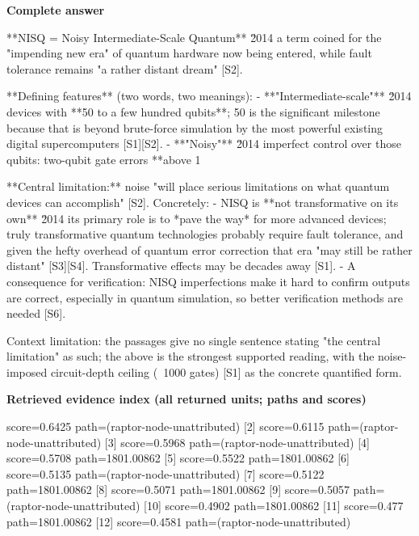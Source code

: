 \documentclass[10pt]{article}
\begin{document}
\textbf{Complete answer}
\begin{AnswerText}
**NISQ = Noisy Intermediate-Scale Quantum** \u2014 a term coined for the "impending new era" of quantum hardware now being entered, while fault tolerance remains "a rather distant dream" [S2].

**Defining features** (two words, two meanings):
- **"Intermediate-scale"** \u2014 devices with **50 to a few hundred qubits**; 50 is the significant milestone because that is beyond brute-force simulation by the most powerful existing digital supercomputers [S1][S2].
- **"Noisy"** \u2014 imperfect control over those qubits: two-qubit gate errors **above 1%

**Central limitation:** noise "will place serious limitations on what quantum devices can accomplish" [S2]. Concretely:
- NISQ is **not transformative on its own** \u2014 its primary role is to *pave the way* for more advanced devices; truly transformative quantum technologies probably require fault tolerance, and given the hefty overhead of quantum error correction that era "may still be rather distant" [S3][S4]. Transformative effects may be decades away [S1].
- A consequence for verification: NISQ imperfections make it hard to confirm outputs are correct, especially in quantum simulation, so better verification methods are needed [S6].

Context limitation: the passages give no single sentence stating "the central limitation" as such; the above is the strongest supported reading, with the noise-imposed circuit-depth ceiling (~1000 gates) [S1] as the concrete quantified form.
\end{AnswerText}

\textbf{Retrieved evidence index (all returned units; paths and scores) }
\begin{EvidenceText}
[1] score=0.6425 path=(raptor-node-unattributed)
[2] score=0.6115 path=(raptor-node-unattributed)
[3] score=0.5968 path=(raptor-node-unattributed)
[4] score=0.5708 path=1801.00862
[5] score=0.5522 path=1801.00862
[6] score=0.5135 path=(raptor-node-unattributed)
[7] score=0.5122 path=1801.00862
[8] score=0.5071 path=1801.00862
[9] score=0.5057 path=(raptor-node-unattributed)
[10] score=0.4902 path=1801.00862
[11] score=0.477 path=1801.00862
[12] score=0.4581 path=(raptor-node-unattributed)
\end{EvidenceText}
\end{document}
